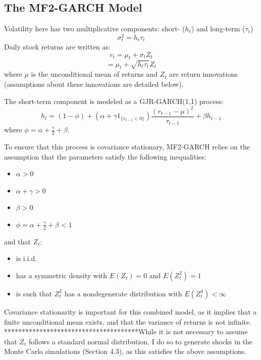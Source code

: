 \documentclass[12pt]{article}
\begin{document}
\subsection{The MF2-GARCH Model}
Volatility here has two multiplicative components: short- ($h_t$) and long-term ($\tau_t$)
\begin{equation}
\nonumber
\sigma_t^2=h_t\tau_t
\end{equation}
Daily stock returns are written as:
\begin{equation}
\nonumber
r_t=\mu_t+\sigma_tZ_t
\end{equation}
\begin{equation}
\nonumber
=\mu_t+\sqrt{h_t\tau_t}Z_t
\end{equation}
where $\mu$ is the unconditional mean of returns and $Z_t$ are return innovations (assumptions about these innovations are detailed below).\par
\vspace{5mm}
\noindent The short-term component is modeled as a GJR-GARCH(1,1) process:
\begin{equation}
h_t=(1-\phi)+(\alpha+\gamma1_{\{r_{t-1}<0\}})\frac{(r_{t-1}-\mu)^2}{\tau_{t-1}}+\beta h_{t-1}
\end{equation}
where $\phi=\alpha+\frac{\gamma}{2}+\beta$.\par
To ensure that this process is covariance stationary, MF2-GARCH relies on the assumption that the parameters satisfy the following inequalities:
\begin{itemize}
\item$\alpha>0$
\item$\alpha+\gamma>0$
\item$\beta>0$
\item$\phi=\alpha+\frac{\gamma}{2}+\beta<1$
\end{itemize}
and that $Z_t$:
\begin{itemize}
\item is i.i.d.
\item has a symmetric density with $E(Z_t)=0$ and $E(Z_t^2)=1$
\item is such that $Z_t^2$ has a nondegenerate distribution with $E(Z_t^4)<\infty$
\end{itemize}
Covariance stationarity is important for this combined model, as it implies that a finite unconditional mean exists, and that the variance of returns is not infinite.
**************************************While it is not necessary to assume that $Z_t$ follows a standard normal distribution, I do so to generate shocks in the Monte Carlo simulations (Section 4.3), as this satisfies the above assumptions.\par
\end{document}
